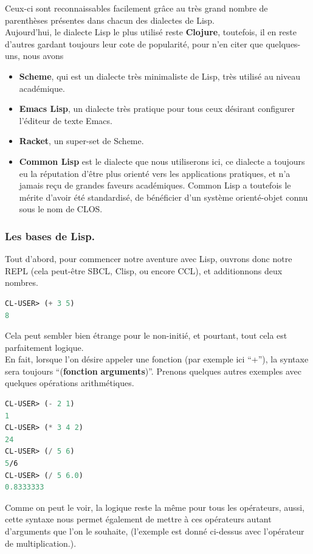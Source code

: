 \documentclass[a4paper, 12pt]{article}
\numberwithin{equation}{subsection}
\begin{document}
Ceux-ci sont reconnaissables facilement grâce au très grand nombre de parenthèses présentes dans chacun des dialectes de Lisp. \\

Aujourd'hui, le dialecte Lisp le plus utilisé reste {\bf Clojure}, toutefois, il en reste d'autres gardant toujours leur cote de popularité, pour n'en citer que quelques-uns, nous avons
\begin{itemize}
  \item {\bf Scheme}, qui est un dialecte très minimaliste de Lisp, très utilisé au niveau académique.
  \item {\bf Emacs Lisp}, un dialecte très pratique pour tous ceux désirant configurer l'éditeur de texte Emacs.
  \item {\bf Racket}, un super-set de Scheme.
  \item {\bf Common Lisp} est le dialecte que nous utiliserons ici, ce dialecte a toujours eu la réputation d'être plus orienté vers les applications pratiques, et n'a jamais reçu de grandes faveurs académiques. Common Lisp a toutefois le mérite d'avoir été standardisé, de bénéficier d'un système orienté-objet connu sous le nom de CLOS.
\end{itemize}
\subsubsection{Les bases de Lisp.}
Tout d'abord, pour commencer notre aventure avec Lisp, ouvrons donc notre REPL (cela peut-être SBCL, Clisp, ou encore CCL), et additionnons deux nombres. \\
\begin{lstlisting}[language=Lisp]
CL-USER> (+ 3 5)
8
\end{lstlisting}
Cela peut sembler bien étrange pour le non-initié, et pourtant, tout cela est parfaitement logique. \\

En fait, lorsque l'on désire appeler une fonction (par exemple ici ``+''), la syntaxe sera toujours ``({\bf fonction} {\bf arguments})''. Prenons quelques autres exemples avec quelques opérations arithmétiques. \\
\begin{lstlisting}[language=Lisp]
CL-USER> (- 2 1)
1
CL-USER> (* 3 4 2)
24
CL-USER> (/ 5 6)
5/6
CL-USER> (/ 5 6.0)
0.8333333
\end{lstlisting}
Comme on peut le voir, la logique reste la même pour tous les opérateurs, aussi, cette syntaxe nous permet également de mettre à ces opérateurs autant d'arguments que l'on le souhaite, (l'exemple est donné ci-dessus avec l'opérateur de multiplication.). \\
\end{document}
